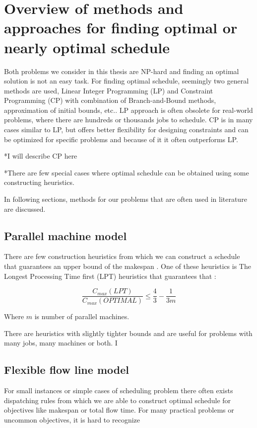 \documentclass{ctuthesis}
\begin{document}
\section{Overview of methods and approaches for finding optimal or nearly optimal schedule}

Both problems we consider in this thesis are NP-hard \cite{complexity} and finding an optimal solution is not an easy task. For finding optimal schedule, seemingly two general methods are used, Linear Integer Programming (LP) and Constraint Programming (CP) with combination of Branch-and-Bound methods, approximation of initial bounds, etc.. LP approach is often obsolete for real-world problems, where there are hundreds or thousands jobs to schedule. CP is in many cases similar to LP, but offers better flexibility for designing constraints and can be optimized for specific problems and because of it it often outperforms LP.

*I will describe CP here

*There are few special cases where optimal schedule can be obtained using some constructing heuristics. 

In following sections, methods for our problems that are often used in literature are discussed.

\subsection{Parallel machine model}

There are few construction heuristics from which we can construct a schedule that guarantees an upper bound of the makespan \cite{gram}. One of these heuristics is The Longest Processing Time first (LPT) heuristics \cite{pinedo} that guarantees that \cite{gram1969}:

\begin{equation}
\dfrac{C_{max}(LPT)}{C_{max}(OPTIMAL)} \leq \dfrac{4}{3} - \dfrac{1}{3m}
\end{equation}

Where $m$ is number of parallel machines.

There are heuristics with slightly tighter bounds and are useful for problems with many jobs, many machines or both. I 

\subsection{Flexible flow line model}

For small instances or simple cases of scheduling problem there often exists dispatching rules from which we are able to construct optimal schedule for objectives like makespan or total flow time. For many practical problems or uncommon objectives, it is hard to recognize 
\end{document}

